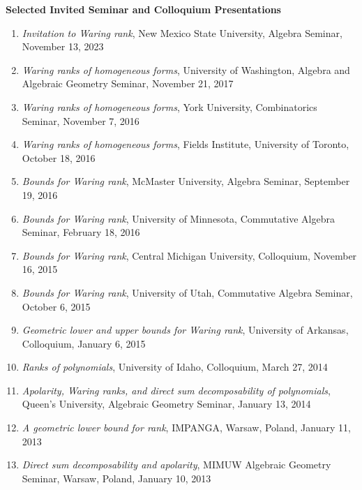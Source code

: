 \documentclass[12pt]{article}
\begin{document}
\textbf{Selected Invited Seminar and Colloquium Presentations}
\begin{enumerate}[revarabic,labelwidth=*]
\item \textit{Invitation to Waring rank}, New Mexico State University, Algebra Seminar, November 13, 2023
\item \textit{Waring ranks of homogeneous forms}, University of Washington, Algebra and Algebraic Geometry Seminar, November 21, 2017
\item \textit{Waring ranks of homogeneous forms}, York University, Combinatorics Seminar, November 7, 2016
\item \textit{Waring ranks of homogeneous forms}, Fields Institute, University of Toronto, October 18, 2016
\item \textit{Bounds for Waring rank}, McMaster University, Algebra Seminar, September 19, 2016
\item \textit{Bounds for Waring rank}, University of Minnesota, Commutative Algebra Seminar, February 18, 2016
\item \textit{Bounds for Waring rank}, Central Michigan University, Colloquium, November 16, 2015
\item \textit{Bounds for Waring rank}, University of Utah, Commutative Algebra Seminar, October 6, 2015
\item \textit{Geometric lower and upper bounds for Waring rank}, University of Arkansas, Colloquium, January 6, 2015
\item \textit{Ranks of polynomials}, University of Idaho, Colloquium, March 27, 2014
\item \textit{Apolarity, Waring ranks, and direct sum decomposability of polynomials}, Queen's University, Algebraic Geometry Seminar, January 13, 2014
\item \textit{A geometric lower bound for rank}, IMPANGA, Warsaw, Poland, January 11, 2013
\item \textit{Direct sum decomposability and apolarity}, MIMUW Algebraic Geometry Seminar, Warsaw, Poland, January 10, 2013

\end{enumerate}
\end{document}

